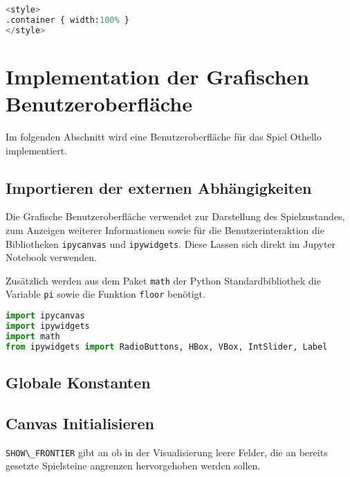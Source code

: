 \begin{lstlisting}[language=Python]
%%HTML
<style>
.container { width:100% }
</style>
\end{lstlisting}

\hypertarget{implementation-der-grafischen-benutzeroberfluxe4che}{%
\section{Implementation der Grafischen
Benutzeroberfläche}\label{implementation-der-grafischen-benutzeroberfluxe4che}}

Im folgenden Abschnitt wird eine Benutzeroberfläche für das Spiel
Othello implementiert.

\hypertarget{importieren-der-externen-abhuxe4ngigkeiten}{%
\subsection{Importieren der externen
Abhängigkeiten}\label{importieren-der-externen-abhuxe4ngigkeiten}}

Die Grafische Benutzeroberfläche verwendet zur Darstellung des
Spielzustandes, zum Anzeigen weiterer Informationen sowie für die
Benutzerinteraktion die Bibliotheken \passthrough{\lstinline!ipycanvas!}
und \passthrough{\lstinline!ipywidgets!}. Diese Lassen sich direkt im
Jupyter Notebook verwenden.

Zusätzlich werden aus dem Paket \passthrough{\lstinline!math!} der
Python Standardbibliothek die Variable \passthrough{\lstinline!pi!}
sowie die Funktion \passthrough{\lstinline!floor!} benötigt.

\begin{lstlisting}[language=Python]
import ipycanvas
import ipywidgets
import math
from ipywidgets import RadioButtons, HBox, VBox, IntSlider, Label
\end{lstlisting}

\hypertarget{globale-konstanten}{%
\subsection{Globale Konstanten}\label{globale-konstanten}}

\hypertarget{canvas-initialisieren}{%
\subsection{Canvas Initialisieren}\label{canvas-initialisieren}}

\passthrough{\lstinline!SHOW\_FRONTIER!} gibt an ob in der
Visualisierung leere Felder, die an bereits gesetzte Spielsteine
angrenzen hervorgehoben werden sollen.

